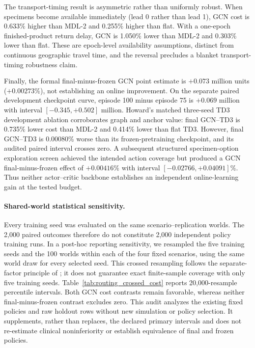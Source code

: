\documentclass[preprint,review,12pt]{elsarticle}
\begin{document}
The transport-timing result is asymmetric rather than uniformly robust. When
specimens become available immediately (lead 0 rather than lead 1), GCN cost is
0.633\% higher than MDL-2 and 0.255\% higher than flat. With a one-epoch
finished-product return delay, GCN is 1.050\% lower than MDL-2 and 0.303\%
lower than flat. These are epoch-level availability assumptions, distinct from
continuous geographic travel time, and the reversal precludes a blanket
transport-timing robustness claim.

Finally, the formal final-minus-frozen GCN point estimate is $+0.073$ million
units ($+0.00273\%$), not establishing an online improvement. On the separate
paired development checkpoint curve, episode 100 minus episode 75 is $+0.069$
million with interval $[-0.345,+0.502]$ million. Howard's matched three-seed
TD3 development ablation corroborates graph and anchor value: final GCN--TD3 is
0.735\% lower cost than MDL-2 and 0.414\% lower than flat TD3. However, final
GCN--TD3 is 0.00080\% worse than its frozen-pretraining checkpoint, and its
audited paired interval crosses zero. A subsequent structured specimen-option
exploration screen achieved the intended action coverage but produced a GCN
final-minus-frozen effect of $+0.00416\%$ with interval
$[-0.02766,+0.04091]\%$. Thus neither actor--critic backbone establishes an
independent online-learning gain at the tested budget.

\paragraph{Shared-world statistical sensitivity.}
Every training seed was evaluated on the same scenario--replication worlds.
The 2,000 paired outcomes therefore do not constitute 2,000 independent policy
training runs. In a post-hoc reporting sensitivity, we resampled the five
training seeds and the 100 worlds within each of the four fixed scenarios,
using the same world draw for every selected seed. This crossed resampling
follows the separate-factor principle of \citet{Owen2007CrossedBootstrap}; it
does not guarantee exact finite-sample coverage with only five training seeds.
Table~\ref{tab:routing_crossed_cost} reports 20,000-resample percentile intervals.
Both GCN cost contrasts remain favorable, whereas neither final-minus-frozen
contrast excludes zero. This audit analyzes the existing fixed policies and
raw holdout rows without new simulation or policy selection. It supplements,
rather than replaces, the declared primary intervals and does not re-estimate
clinical noninferiority or establish equivalence of final and frozen policies.
\end{document}
